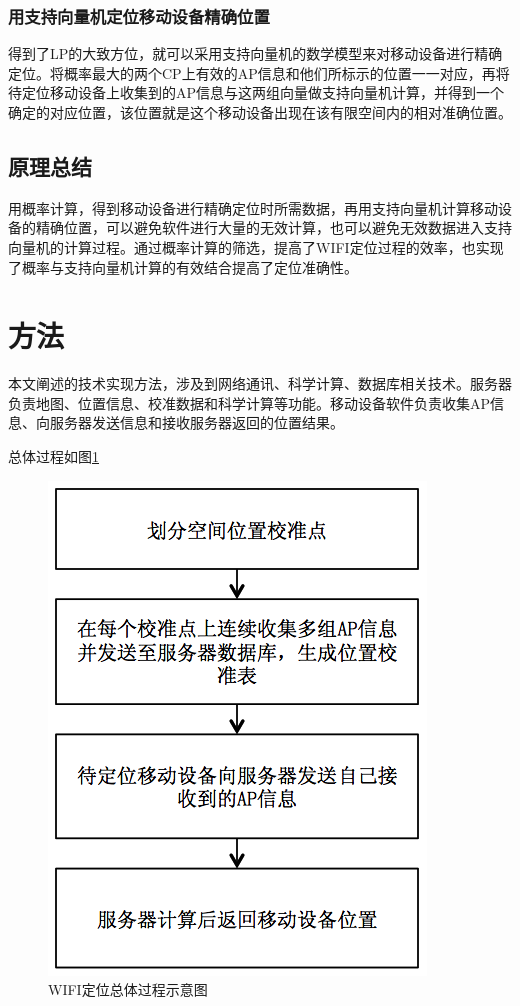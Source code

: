 \documentclass[UTF8, twocolumn ]{ctexart}
\begin{document}
\subsubsection{用支持向量机定位移动设备精确位置}
得到了LP的大致方位，就可以采用支持向量机的数学模型来对移动设备进行精确定位。将概率最大的两个CP上有效的AP信息和他们所标示的位置一一对应，再将待定位移动设备上收集到的AP信息与这两组向量做支持向量机计算，并得到一个确定的对应位置，该位置就是这个移动设备出现在该有限空间内的相对准确位置。

\subsection{原理总结}
用概率计算，得到移动设备进行精确定位时所需数据，再用支持向量机计算移动设备的精确位置，可以避免软件进行大量的无效计算，也可以避免无效数据进入支持向量机的计算过程。通过概率计算的筛选，提高了WIFI定位过程的效率，也实现了概率与支持向量机计算的有效结合提高了定位准确性。


\section{方法}
本文阐述的技术实现方法，涉及到网络通讯、科学计算、数据库相关技术。服务器负责地图、位置信息、校准数据和科学计算等功能。移动设备软件负责收集AP信息、向服务器发送信息和接收服务器返回的位置结果。
\par
总体过程如图\ref{fig:no1}
\begin{figure}[!ht]\centering
  \includegraphics[keepaspectratio, scale=0.4]{no1.png}
  \caption{WIFI定位总体过程示意图\label{fig:no1}} 
\end{figure}
\end{document}
